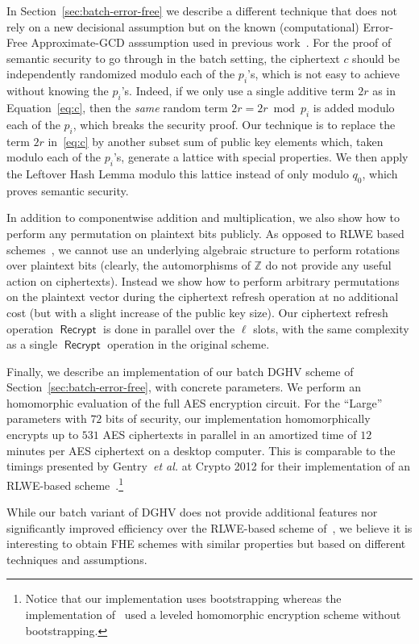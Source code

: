 \documentclass{llncs}
\newcommand{\etal}{\textsl{et al.}\xspace}
\newcommand{\Z}{{\mathbb Z}}
\DeclareMathOperator{\Recrypt}{\ensuremath{\mathsf{Recrypt}}}
\begin{document}
In Section~\ref{sec:batch-error-free} we describe a different
technique that does not rely on a new decisional assumption but on the known  (computational)
Error-Free Approximate-GCD asssumption used in previous
work~\cite{vDGHV2010,CMNT2011,CNT2012}. For the proof of semantic 
security to go through in the batch setting, the ciphertext $c$
should be independently randomized modulo each of the $p_i$'s, which is not 
easy to achieve without knowing the $p_i$'s. Indeed, if we only use a 
single additive term $2r$ as in Equation~\eqref{eq:c}, then the \emph{same} random 
term $2r=2r \bmod p_i$ is added modulo each of the $p_i$, which breaks 
the security proof. Our technique is to replace
the term $2r$ in~\eqref{eq:c} by another subset sum of public key elements which, taken
modulo each of the $p_i$'s, generate a lattice with special properties.
We then apply the Leftover Hash Lemma modulo this
lattice instead of only modulo $q_0$, which proves semantic security.

In addition to componentwise addition and multiplication, we also show
how to perform any permutation on plaintext bits publicly. As opposed
to RLWE based schemes~\cite{BGV2012,GHS2012a}, we cannot use an underlying algebraic
structure to perform rotations over plaintext bits (clearly, the
automorphisms of $\Z$ do not provide any useful action on ciphertexts).
Instead we show how to perform arbitrary permutations on the plaintext
vector during the ciphertext refresh operation at no additional cost (but with
a slight increase of the public key size). Our ciphertext refresh
operation $\Recrypt$ is done in parallel over the 
$\ell$ slots, with the same complexity as a single $\Recrypt$
operation in the original scheme.

Finally, we describe an implementation of our batch DGHV scheme of Section~\ref{sec:batch-error-free}, with
concrete parameters. We perform an homomorphic evaluation of
the full AES encryption circuit. For the ``Large'' parameters
with $72$ bits of security, our implementation  homomorphically
encrypts up to  $531$ AES ciphertexts in parallel in an amortized time of $12$
minutes per AES ciphertext on a desktop computer. This is comparable to
the timings presented by Gentry~\etal at Crypto 2012 for their
implementation of an RLWE-based scheme~\cite{GHS2012c}.\footnote{
Notice that our implementation uses bootstrapping whereas the implementation
of~\cite{GHS2012c} used a leveled homomorphic encryption scheme
without bootstrapping.}

While our batch variant of DGHV does not provide additional features nor
significantly improved efficiency over the RLWE-based scheme of~\cite{GHS2012a}, we believe it is interesting to obtain FHE schemes with
similar properties but based on different techniques and assumptions.  
\end{document}
